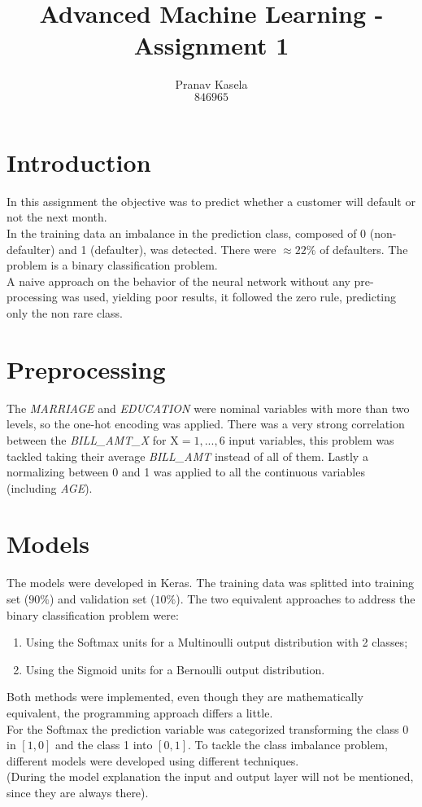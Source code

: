 \documentclass[12pt, twocolumn]{article}
\title{Advanced Machine Learning - Assignment 1}
\author{Pranav Kasela \\$846965$}
\date{}
\begin{document}
\maketitle

\section*{Introduction}
In this assignment the objective was to predict whether a customer will default or not the next month.\\
In the training data an imbalance in the prediction class, composed of 0 (non-defaulter) and 1 (defaulter), was detected. 
There were $\approx 22\%$ of defaulters.
The problem is a binary classification problem.\\
A naive approach on the behavior of the neural network without any pre-processing was used, yielding poor results, it followed the zero rule, predicting only the non rare class.

\section*{Preprocessing}
The \textit{MARRIAGE} and \textit{EDUCATION} were nominal variables with more than two levels, so the one-hot encoding was applied.
There was a very strong correlation between the \textit{BILL\_AMT\_X} for X$=1,...,6$ input variables, this problem was tackled taking their average \textit{BILL\_AMT} instead of all of them.
Lastly a normalizing between 0 and 1 was applied to all the continuous variables (including \textit{AGE}).

\section*{Models}
The models were developed in Keras. The training data was splitted into training set ($90\%$) and validation set ($10\%$).
The two equivalent approaches to address the binary classification problem were:
\begin{enumerate}
	\item Using the Softmax units for a Multinoulli output distribution with 2 classes;
	\item Using the Sigmoid units for a Bernoulli output distribution.
\end{enumerate}
Both methods were implemented, even though they are mathematically equivalent, the programming approach differs a little.\\
For the Softmax the prediction variable was categorized transforming the class 0 in $[1,0]$ and the class 1 into $[0,1]$.
To tackle the class imbalance problem, different models were developed using different techniques.\\
(During the model explanation the input and output layer will not be mentioned, since they are always there).
\vspace{-0.4cm}
\end{document}
